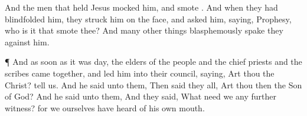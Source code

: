 {And the
men
that
held
Jesus
mocked
him, and
smote
{}.
And when they had
blindfolded
him, they
struck
him on the
face,
and
asked
him,
saying,
Prophesy,
who is
it
that
smote
thee?
And
many other
things
blasphemously spake
they
against
him.
\par }{\PP {}¶
And as soon
as it
was
day, the
elders of the
people
and the chief
priests
and the
scribes came
together,
and
led
him
into
their
council,
saying,
Art
thou the
Christ?
tell
us.
And he
said unto
them,
{}
Then said
they
all,
Art
thou
then the
Son of
God?
And he
said
unto
them,
{}
And they
said,
What
need we
any
further
witness?
for we
ourselves have
heard
of his
own
mouth.

}
